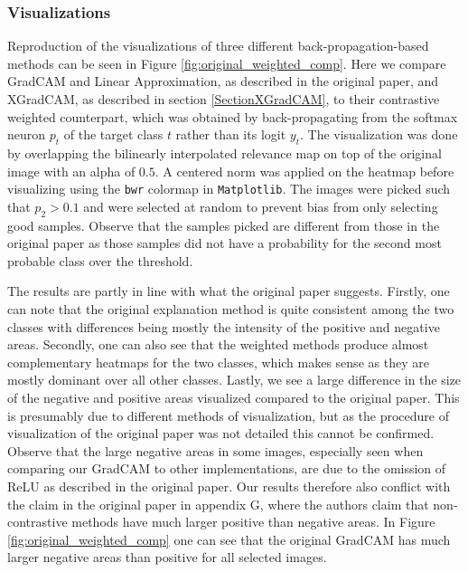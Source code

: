 \subsubsection{Visualizations}
Reproduction of the visualizations of three different back-propagation-based methods can be seen in Figure \ref{fig:original_weighted_comp}. Here we compare GradCAM and Linear Approximation, as described in the original paper, and XGradCAM, as described in section \ref{SectionXGradCAM}, to their contrastive weighted counterpart, which was obtained by back-propagating from the softmax neuron $p_t$ of the target class $t$ rather than its logit $y_t$. The visualization was done by overlapping the bilinearly interpolated relevance map on top of the original image with an alpha of $0.5$. A centered norm was applied on the heatmap before visualizing using the \texttt{bwr} colormap in \texttt{Matplotlib}. The images were picked such that $p_2 > 0.1$ and were selected at random to prevent bias from only selecting good samples. Observe that the samples picked are different from those in the original paper as those samples did not have a probability for the second most probable class over the threshold.

The results are partly in line with what the original paper suggests. Firstly, one can note that the original explanation method is quite consistent among the two classes with differences being mostly the intensity of the positive and negative areas. Secondly, one can also see that the weighted methods produce almost complementary heatmaps for the two classes, which makes sense as they are mostly dominant over all other classes. Lastly, we see a large difference in the size of the negative and positive areas visualized compared to the original paper. This is presumably due to different methods of visualization, but as the procedure of visualization of the original paper was not detailed this cannot be confirmed. Observe that the large negative areas in some images, especially seen when comparing our GradCAM to other implementations, are due to the omission of ReLU as described in the original paper. Our results therefore also conflict with the claim in the original paper in appendix G, where the authors claim that non-contrastive methods have much larger positive than negative areas. In Figure \ref{fig:original_weighted_comp} one can see that the original GradCAM has much larger negative areas than positive for all selected images.



